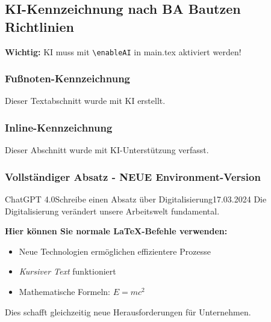 \documentclass[../main.tex]{subfiles}
\begin{document}

\subsection{KI-Kennzeichnung nach BA Bautzen Richtlinien}

\textbf{Wichtig:} KI muss mit \verb|\enableAI| in main.tex aktiviert werden!

\subsubsection{Fußnoten-Kennzeichnung}
Dieser Textabschnitt wurde mit KI erstellt.

\subsubsection{Inline-Kennzeichnung}
Dieser Abschnitt wurde mit KI-Unterstützung verfasst.

\subsubsection{Vollständiger Absatz - NEUE Environment-Version}
\begin{aiparagraph}{ChatGPT 4.0}{Schreibe einen Absatz über Digitalisierung}{17.03.2024}
Die Digitalisierung verändert unsere Arbeitswelt fundamental. 

\textbf{Hier können Sie normale LaTeX-Befehle verwenden:}
\begin{itemize}
    \item Neue Technologien ermöglichen effizientere Prozesse
    \item \textit{Kursiver Text} funktioniert
    \item Mathematische Formeln: $E = mc^2$
\end{itemize}

Dies schafft gleichzeitig neue Herausforderungen für Unternehmen.
\end{aiparagraph}
\end{document}
